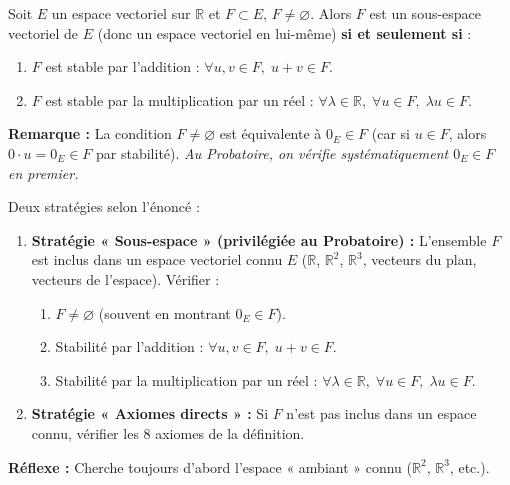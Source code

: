 \documentclass[11pt]{article}
\newcommand{\cle}[1]{{\popxbold\color{popdark}#1}}
\begin{document}
\begin{propriete}
Soit $E$ un espace vectoriel sur $\mathbb{R}$ et $F\subset E$, $F\neq\varnothing$. Alors $F$ est un \cle{sous-espace vectoriel} de $E$ (donc un espace vectoriel en lui-même) \textbf{si et seulement si} :
\begin{enumerate}
\item $F$ est stable par l'addition : $\forall u,v\in F,\; u+v\in F$.
\item $F$ est stable par la multiplication par un réel : $\forall \lambda\in\mathbb{R},\; \forall u\in F,\; \lambda u\in F$.
\end{enumerate}
\textbf{Remarque :} La condition $F\neq\varnothing$ est équivalente à $0_E\in F$ (car si $u\in F$, alors $0\cdot u=0_E\in F$ par stabilité). \emph{Au Probatoire, on vérifie systématiquement $0_E\in F$ en premier.}
\end{propriete}

\begin{methode}
Deux stratégies selon l'énoncé :
\begin{enumerate}
\item \textbf{Stratégie « Sous-espace » (privilégiée au Probatoire) :} L'ensemble $F$ est inclus dans un espace vectoriel connu $E$ ($\mathbb{R}$, $\mathbb{R}^2$, $\mathbb{R}^3$, vecteurs du plan, vecteurs de l'espace). Vérifier :
      \begin{enumerate}
      \item $F\neq\varnothing$ (souvent en montrant $0_E\in F$).
      \item Stabilité par l'addition : $\forall u,v\in F,\; u+v\in F$.
      \item Stabilité par la multiplication par un réel : $\forall \lambda\in\mathbb{R},\; \forall u\in F,\; \lambda u\in F$.
      \end{enumerate}
\item \textbf{Stratégie « Axiomes directs » :} Si $F$ n'est pas inclus dans un espace connu, vérifier les 8 axiomes de la définition.
\end{enumerate}
\textbf{Réflexe :} Cherche toujours d'abord l'espace « ambiant » connu ($\mathbb{R}^2$, $\mathbb{R}^3$, etc.).
\end{methode}
\end{document}
